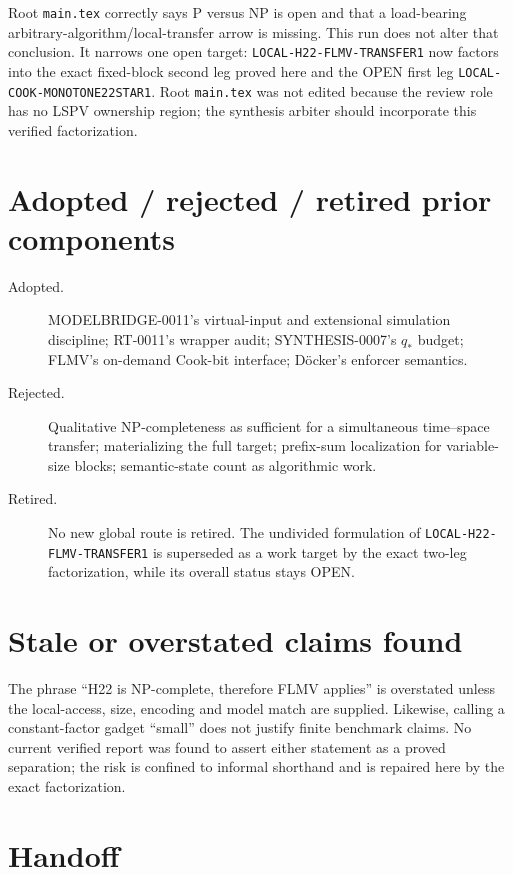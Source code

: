 \documentclass[11pt]{article}
\begin{document}
Root \texttt{main.tex} correctly says P versus NP is open and that a
load-bearing arbitrary-algorithm/local-transfer arrow is missing.  This run
does not alter that conclusion.  It narrows one open target:
\texttt{LOCAL-H22-FLMV-TRANSFER1} now factors into the exact fixed-block
second leg proved here and the OPEN first leg
\texttt{LOCAL-COOK-MONOTONE22STAR1}.  Root \texttt{main.tex} was not edited
because the review role has no LSPV ownership region; the synthesis arbiter
should incorporate this verified factorization.

\section{Adopted / rejected / retired prior components}

\begin{description}
\item[Adopted.] MODELBRIDGE-0011's virtual-input and extensional simulation
discipline; RT-0011's wrapper audit; SYNTHESIS-0007's $q_*$ budget; FLMV's
on-demand Cook-bit interface; D\"ocker's enforcer semantics.
\item[Rejected.] Qualitative NP-completeness as sufficient for a simultaneous
time--space transfer; materializing the full target; prefix-sum localization
for variable-size blocks; semantic-state count as algorithmic work.
\item[Retired.] No new global route is retired.  The undivided formulation of
\texttt{LOCAL-H22-FLMV-TRANSFER1} is superseded as a work target by the exact
two-leg factorization, while its overall status stays OPEN.
\end{description}

\section{Stale or overstated claims found}

The phrase ``H22 is NP-complete, therefore FLMV applies'' is overstated unless
the local-access, size, encoding and model match are supplied.  Likewise,
calling a constant-factor gadget ``small'' does not justify finite benchmark
claims.  No current verified report was found to assert either statement as a
proved separation; the risk is confined to informal shorthand and is repaired
here by the exact factorization.

\section*{Handoff}
\end{document}
